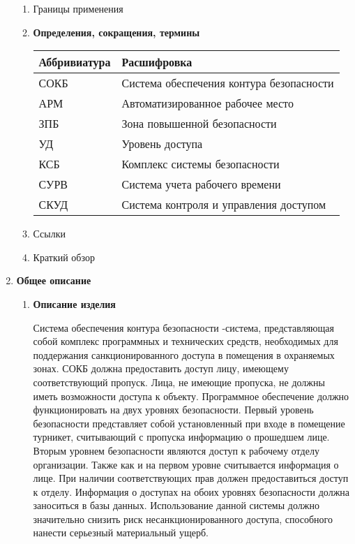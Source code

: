 \documentclass[12pt]{article} %
\begin{document}
\begin{enumerate}
\begin{enumerate}
        \item Границы применения
        \item \begin{large} \textbf{Определения, сокращения, термины} \end{large} \newline
          \begin{tabular}{ | l | l |}
            \hline
            Аббривиатура & Расшифровка \\ \hline
            СОКБ & Система обеспечения контура безопасности \\
            АРМ & Автоматизированное рабочее место \\
            ЗПБ & Зона повышенной безопасности \\
            УД & Уровень доступа \\
            КСБ & Комплекс системы безопасности \\
            СУРВ & Система учета рабочего времени \\
            СКУД & Система контроля и управления доступом \\
            \hline
          \end{tabular}
        \item Ссылки
        \item Краткий обзор
    \end{enumerate} 
  \item  \begin{large} \textbf{Общее описание} \end{large} \newline
  	\begin{enumerate}
  		\item \begin{large} \textbf{Описание изделия} \end{large} \newline
        Система обеспечения контура безопасности -система, представляющая собой комплекс программных и технических средств, необходимых для поддержания санкционированного доступа в помещения в охраняемых зонах.
        СОКБ должна предоставить доступ лицу, имеющему соответствующий пропуск. Лица, не имеющие пропуска, не должны иметь возможности доступа к объекту.  
        Программное обеспечение должно функционировать на двух уровнях безопасности. Первый уровень безопасности представляет собой установленный при входе в помещение турникет, считывающий с пропуска информацию о прошедшем лице. Вторым уровнем безопасности являются доступ к рабочему отделу организации. Также как и на первом уровне считывается информация о лице. При наличии соответствующих прав должен предоставиться доступ к отделу. Информация о доступах на обоих уровнях безопасности должна заноситься в базы данных. 
        Использование данной системы должно значительно снизить риск несанкционированного доступа, способного нанести серьезный материальный ущерб. 


\end{enumerate}
\end{enumerate}
\end{document}
